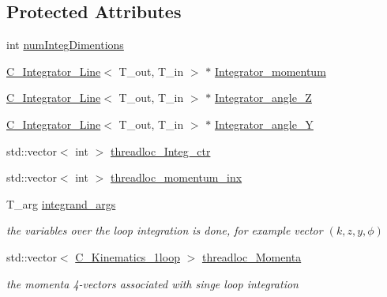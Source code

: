 \subsection*{Protected Attributes}
\begin{DoxyCompactItemize}
\item 
int \hyperlink{class_c___one_loop_integrator_aed8066a37eaa0865bd484ffd18884abb}{num\-Integ\-Dimentions}
\item 
\hyperlink{class_c___integrator___line}{C\-\_\-\-Integrator\-\_\-\-Line}$<$ T\-\_\-out, T\-\_\-in $>$ $\ast$ \hyperlink{class_c___one_loop_integrator_af884706bf7461487cfb254d78b797e94}{Integrator\-\_\-momentum}
\item 
\hyperlink{class_c___integrator___line}{C\-\_\-\-Integrator\-\_\-\-Line}$<$ T\-\_\-out, T\-\_\-in $>$ $\ast$ \hyperlink{class_c___one_loop_integrator_a2826eadcd033a03808d645cd883acceb}{Integrator\-\_\-angle\-\_\-\-Z}
\item 
\hyperlink{class_c___integrator___line}{C\-\_\-\-Integrator\-\_\-\-Line}$<$ T\-\_\-out, T\-\_\-in $>$ $\ast$ \hyperlink{class_c___one_loop_integrator_a5770d28cb44d0ea9c3d331203ee84440}{Integrator\-\_\-angle\-\_\-\-Y}
\item 
std\-::vector$<$ int $>$ \hyperlink{class_c___one_loop_integrator_a78ea7c4afee6c20ed50e6fa171a47dc3}{threadloc\-\_\-\-Integ\-\_\-ctr}
\item 
std\-::vector$<$ int $>$ \hyperlink{class_c___one_loop_integrator_af7ddf02e8c2d913b2a38f6670e26ac3b}{threadloc\-\_\-momentum\-\_\-inx}
\item 
T\-\_\-arg \hyperlink{class_c___one_loop_integrator_a196a8d045623e4af5d4bb9fca7c105bb}{integrand\-\_\-args}
\begin{DoxyCompactList}\small\item\em the variables over the loop integration is done, for example vector $ (k,z,y,\phi) $ \end{DoxyCompactList}\item 
std\-::vector$<$ \hyperlink{class_c___kinematics__1loop}{C\-\_\-\-Kinematics\-\_\-1loop} $>$ \hyperlink{class_c___one_loop_integrator_a767bf7500b35433779ed8b2fdb5b73a7}{threadloc\-\_\-\-Momenta}
\begin{DoxyCompactList}\small\item\em the momenta 4-\/vectors associated with singe loop integration \end{DoxyCompactList}\end{DoxyCompactItemize}


